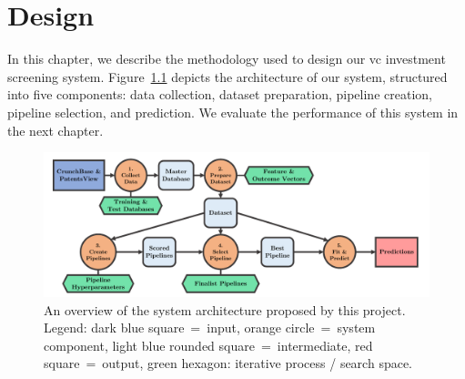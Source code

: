 \documentclass[../thesis/thesis.tex]{subfiles}
\begin{document}
\chapter{Design}
\label{chap:design}

In this chapter, we describe the methodology used to design our \gls{vc} investment screening system. Figure~\ref{fig:design:system_architecture} depicts the architecture of our system, structured into five components: data collection, dataset preparation, pipeline creation, pipeline selection, and prediction. We evaluate the performance of this system in the next chapter.

\begin{figure}[!htb]
    \centering
    \includegraphics[width=\textwidth]{../figures/design/flowchart_overview}
    \caption[System architecture flowchart]{An overview of the system architecture proposed by this project. Legend: dark blue square~=~input, orange circle~=~system component, light blue rounded square~=~intermediate, red square~=~output, green hexagon: iterative process / search space.}
    \label{fig:design:system_architecture}
\end{figure}
\end{document}
